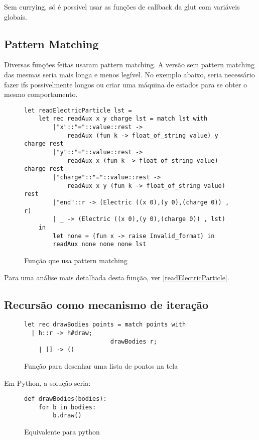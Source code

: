 \documentclass[a4paper,10pt]{article}
\begin{document}
	Sem currying, só é possível usar as funções de callback da glut com variáveis globais.
	
\subsection{Pattern Matching}

Diversas funções feitas usaram pattern matching. A versão sem pattern matching das mesmas seria mais longa e menos legível. No exemplo abaixo, seria necessário fazer ifs possivelmente longos ou criar uma máquina de estados para se obter o mesmo comportamento.

\begin{figure}[H]
	\centering	
	\begin{lstlisting}
let readElectricParticle lst =
	let rec readAux x y charge lst = match lst with
		|"x"::"="::value::rest ->
			readAux (fun k -> float_of_string value) y charge rest
		|"y"::"="::value::rest ->
			readAux x (fun k -> float_of_string value) charge rest
		|"charge"::"="::value::rest ->
			readAux x y (fun k -> float_of_string value) rest
		|"end"::r -> (Electric ((x 0),(y 0),(charge 0)) , r)
		| _ -> (Electric ((x 0),(y 0),(charge 0)) , lst)
	in
		let none = (fun x -> raise Invalid_format) in
		readAux none none none lst
	\end{lstlisting}
	\caption{Função que usa pattern matching}
\end{figure}

	Para uma análise mais detalhada desta função, ver \autoref{readElectricParticle}.

\subsection{Recursão como mecanismo de iteração}

\begin{figure}[H]
	\centering	
	\begin{lstlisting}
let rec drawBodies points = match points with
  | h::r -> h#draw;
						drawBodies r;
	| [] -> ()
	\end{lstlisting}
	\caption{Função para desenhar uma lista de pontos na tela}
\end{figure}

	Em Python, a solução seria:
	
	\begin{figure}[H]
	\centering	
	\begin{lstlisting}
def drawBodies(bodies):
	for b in bodies:
		b.draw()	
	\end{lstlisting}
	\caption{Equivalente para python}
\end{figure}
	
\end{document}
